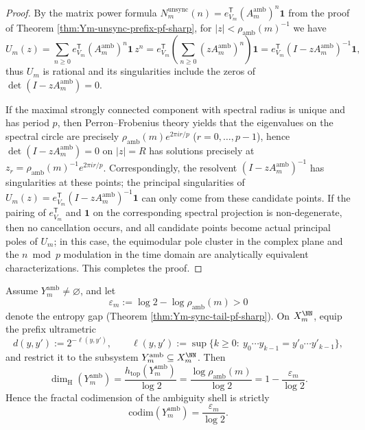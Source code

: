 \begin{proof}
By the matrix power formula
\(
N_m^{\mathrm{unsync}}(n)=e_{V_m}^{\mathsf T}(A_m^{\mathrm{amb}})^n\mathbf 1
\)
from the proof of Theorem \ref{thm:Ym-unsync-prefix-pf-sharp}, for \(|z|<\rho_{\mathrm{amb}}(m)^{-1}\) we have
\[
U_m(z)=\sum_{n\ge 0}e_{V_m}^{\mathsf T}(A_m^{\mathrm{amb}})^n\mathbf 1\,z^n
=e_{V_m}^{\mathsf T}\left(\sum_{n\ge 0}(zA_m^{\mathrm{amb}})^n\right)\mathbf 1
=e_{V_m}^{\mathsf T}(I-zA_m^{\mathrm{amb}})^{-1}\mathbf 1,
\]
thus \(U_m\) is rational and its singularities include the zeros of \(\det(I-zA_m^{\mathrm{amb}})=0\).
\par
If the maximal strongly connected component with spectral radius is unique and has period \(p\), then Perron--Frobenius theory yields that the eigenvalues on the spectral circle are precisely
\(
\rho_{\mathrm{amb}}(m)e^{2\pi i r/p}
\)
(\(r=0,\dots,p-1\)), hence
\(
\det(I-zA_m^{\mathrm{amb}})=0
\)
on \(|z|=R\) has solutions precisely at
\(
z_r=\rho_{\mathrm{amb}}(m)^{-1}e^{2\pi i r/p}
\).
Correspondingly, the resolvent \((I-zA_m^{\mathrm{amb}})^{-1}\) has singularities at these points; the principal singularities of \(U_m(z)=e_{V_m}^{\mathsf T}(I-zA_m^{\mathrm{amb}})^{-1}\mathbf 1\) can only come from these candidate points.
If the pairing of \(e_{V_m}^{\mathsf T}\) and \(\mathbf 1\) on the corresponding spectral projection is non-degenerate, then no cancellation occurs, and all candidate points become actual principal poles of \(U_m\); in this case, the equimodular pole cluster in the complex plane and the \(n\bmod p\) modulation in the time domain are analytically equivalent characterizations. This completes the proof.
\end{proof}

\begin{corollary}[Hausdorff dimension and codimension closed-form for the ambiguity shell: \texorpdfstring{$\mathrm{codim}=\varepsilon_m/\log 2$}{codim=eps/log2}]\label{cor:Ym-amb-hausdorff-codim}
Assume \(Y_m^{\mathrm{amb}}\neq\varnothing\), and let
\[
\varepsilon_m:=\log 2-\log\rho_{\mathrm{amb}}(m)>0
\]
denote the entropy gap (Theorem \ref{thm:Ym-sync-tail-pf-sharp}).
On \(X_m^{\NN}\), equip the prefix ultrametric
\[
d(y,y'):=2^{-\ell(y,y')},
\qquad
\ell(y,y'):=\sup\{k\ge 0:\ y_0\cdots y_{k-1}=y'_0\cdots y'_{k-1}\},
\]
and restrict it to the subsystem \(Y_m^{\mathrm{amb}}\subseteq X_m^{\NN}\).
Then
\[
\dim_{\mathrm H}(Y_m^{\mathrm{amb}})
=\frac{h_{\mathrm{top}}(Y_m^{\mathrm{amb}})}{\log 2}
=\frac{\log\rho_{\mathrm{amb}}(m)}{\log 2}
=1-\frac{\varepsilon_m}{\log 2}.
\]
Hence the fractal codimension of the ambiguity shell is strictly
\[
\mathrm{codim}(Y_m^{\mathrm{amb}})=\frac{\varepsilon_m}{\log 2}.
\]
\end{corollary}

